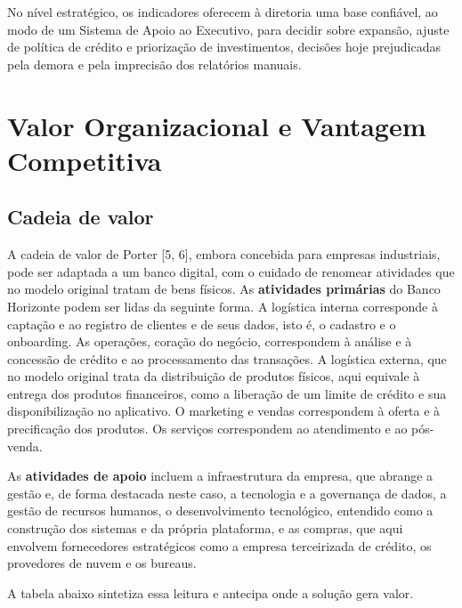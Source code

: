 \documentclass[12pt,a4paper]{article}
\begin{document}
No n\'ivel estrat\'egico, os indicadores oferecem \`a diretoria uma base confi\'avel, ao modo de um Sistema de Apoio ao Executivo, para decidir sobre expans\~ao, ajuste de pol\'itica de cr\'edito e prioriza\c{c}\~ao de investimentos, decis\~oes hoje prejudicadas pela demora e pela imprecis\~ao dos relat\'orios manuais.

\section{Valor Organizacional e Vantagem Competitiva}

\subsection{Cadeia de valor}

A cadeia de valor de Porter [5, 6], embora concebida para empresas industriais, pode ser adaptada a um banco digital, com o cuidado de renomear atividades que no modelo original tratam de bens f\'isicos. As \textbf{atividades prim\'arias} do Banco Horizonte podem ser lidas da seguinte forma. A log\'istica interna corresponde \`a capta\c{c}\~ao e ao registro de clientes e de seus dados, isto \'e, o cadastro e o onboarding. As opera\c{c}\~oes, cora\c{c}\~ao do neg\'ocio, correspondem \`a an\'alise e \`a concess\~ao de cr\'edito e ao processamento das transa\c{c}\~oes. A log\'istica externa, que no modelo original trata da distribui\c{c}\~ao de produtos f\'isicos, aqui equivale \`a entrega dos produtos financeiros, como a libera\c{c}\~ao de um limite de cr\'edito e sua disponibiliza\c{c}\~ao no aplicativo. O marketing e vendas correspondem \`a oferta e \`a precifica\c{c}\~ao dos produtos. Os servi\c{c}os correspondem ao atendimento e ao p\'os-venda.

As \textbf{atividades de apoio} incluem a infraestrutura da empresa, que abrange a gest\~ao e, de forma destacada neste caso, a tecnologia e a governan\c{c}a de dados, a gest\~ao de recursos humanos, o desenvolvimento tecnol\'ogico, entendido como a constru\c{c}\~ao dos sistemas e da pr\'opria plataforma, e as compras, que aqui envolvem fornecedores estrat\'egicos como a empresa terceirizada de cr\'edito, os provedores de nuvem e os bureaus.

A tabela abaixo sintetiza essa leitura e antecipa onde a solu\c{c}\~ao gera valor.
\end{document}
